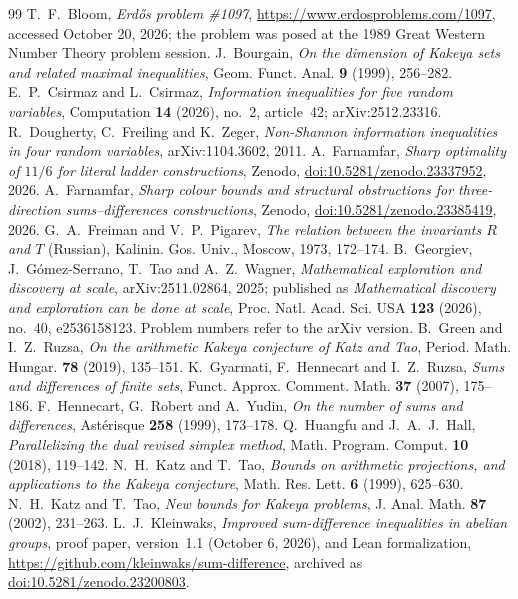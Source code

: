 \documentclass[11pt]{amsart}
\theoremstyle{definition}
\theoremstyle{remark}
\numberwithin{equation}{section}
\begin{document}
\begin{thebibliography}{99}
 T.~F.~Bloom, \emph{Erd\H{o}s problem \#1097}, \url{https://www.erdosproblems.com/1097}, accessed October 20, 2026; the problem was posed at the 1989 Great Western Number Theory problem session.
 J.~Bourgain, \emph{On the dimension of Kakeya sets and related maximal inequalities}, Geom. Funct. Anal. \textbf{9} (1999), 256--282.
 E.~P.~Csirmaz and L.~Csirmaz, \emph{Information inequalities for five random variables}, Computation \textbf{14} (2026), no.~2, article~42; arXiv:2512.23316.
 R.~Dougherty, C.~Freiling and K.~Zeger, \emph{Non-Shannon information inequalities in four random variables}, arXiv:1104.3602, 2011.
 A.~Farnamfar, \emph{Sharp optimality of $11/6$ for literal ladder constructions}, Zenodo, \href{https://doi.org/10.5281/zenodo.23337952}{doi:10.5281/zenodo.23337952}, 2026.
 A.~Farnamfar, \emph{Sharp colour bounds and structural obstructions for three-direction sums--differences constructions}, Zenodo, \href{https://doi.org/10.5281/zenodo.23385419}{doi:10.5281/zenodo.23385419}, 2026.
 G.~A.~Freiman and V.~P.~Pigarev, \emph{The relation between the invariants $R$ and $T$} (Russian), Kalinin. Gos. Univ., Moscow, 1973, 172--174.
 B.~Georgiev, J.~G\'omez-Serrano, T.~Tao and A.~Z.~Wagner, \emph{Mathematical exploration and discovery at scale}, arXiv:2511.02864, 2025; published as \emph{Mathematical discovery and exploration can be done at scale}, Proc. Natl. Acad. Sci. USA \textbf{123} (2026), no.~40, e2536158123. Problem numbers refer to the arXiv version.
 B.~Green and I.~Z.~Ruzsa, \emph{On the arithmetic Kakeya conjecture of Katz and Tao}, Period. Math. Hungar. \textbf{78} (2019), 135--151.
 K.~Gyarmati, F.~Hennecart and I.~Z.~Ruzsa, \emph{Sums and differences of finite sets}, Funct. Approx. Comment. Math. \textbf{37} (2007), 175--186.
 F.~Hennecart, G.~Robert and A.~Yudin, \emph{On the number of sums and differences}, Ast\'erisque \textbf{258} (1999), 173--178.
 Q.~Huangfu and J.~A.~J.~Hall, \emph{Parallelizing the dual revised simplex method}, Math. Program. Comput. \textbf{10} (2018), 119--142.
 N.~H.~Katz and T.~Tao, \emph{Bounds on arithmetic projections, and applications to the Kakeya conjecture}, Math. Res. Lett. \textbf{6} (1999), 625--630.
 N.~H.~Katz and T.~Tao, \emph{New bounds for Kakeya problems}, J. Anal. Math. \textbf{87} (2002), 231--263.
 L.~J.~Kleinwaks, \emph{Improved sum-difference inequalities in abelian groups}, proof paper, version~1.1 (October 6, 2026), and Lean formalization, \url{https://github.com/kleinwaks/sum-difference}, archived as \href{https://doi.org/10.5281/zenodo.23200803}{doi:10.5281/zenodo.23200803}.

\end{thebibliography}
\end{document}
